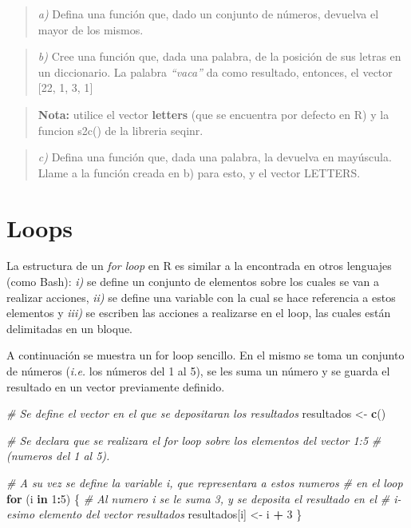 \documentclass[]{article}
\newenvironment{Shaded}{\begin{snugshade}}{\end{snugshade}}
\newcommand{\CommentTok}[1]{\textcolor[rgb]{0.56,0.35,0.01}{\textit{#1}}}
\newcommand{\ControlFlowTok}[1]{\textcolor[rgb]{0.13,0.29,0.53}{\textbf{#1}}}
\newcommand{\DecValTok}[1]{\textcolor[rgb]{0.00,0.00,0.81}{#1}}
\newcommand{\KeywordTok}[1]{\textcolor[rgb]{0.13,0.29,0.53}{\textbf{#1}}}
\newcommand{\NormalTok}[1]{#1}
\newcommand{\OperatorTok}[1]{\textcolor[rgb]{0.81,0.36,0.00}{\textbf{#1}}}
\newcommand{\StringTok}[1]{\textcolor[rgb]{0.31,0.60,0.02}{#1}}
\begin{document}
\begin{quote}
\emph{a)} Defina una función que, dado un conjunto de números, devuelva
el mayor de los mismos.
\end{quote}

\begin{quote}
\emph{b)} Cree una función que, dada una palabra, de la posición de sus
letras en un diccionario. La palabra \emph{``vaca''} da como resultado,
entonces, el vector {[}22, 1, 3, 1{]}
\end{quote}

\begin{quote}
\textbf{Nota:} utilice el vector \textbf{letters} (que se encuentra por
defecto en R) y la funcion s2c() de la libreria seqinr.
\end{quote}

\begin{quote}
\emph{c)} Defina una función que, dada una palabra, la devuelva en
mayúscula. Llame a la función creada en b) para esto, y el vector
LETTERS.
\end{quote}

\hypertarget{loops}{%
\section{Loops}\label{loops}}

La estructura de un \emph{for loop} en R es similar a la encontrada en
otros lenguajes (como Bash): \emph{i)} se define un conjunto de
elementos sobre los cuales se van a realizar acciones, \emph{ii)} se
define una variable con la cual se hace referencia a estos elementos y
\emph{iii)} se escriben las acciones a realizarse en el loop, las cuales
están delimitadas en un bloque.

A continuación se muestra un for loop sencillo. En el mismo se toma un
conjunto de números (\emph{i.e.} los números del 1 al 5), se les suma un
número y se guarda el resultado en un vector previamente definido.

\begin{Shaded}
\begin{Highlighting}[]
\CommentTok{# Se define el vector en el que se depositaran los resultados}
\NormalTok{resultados <-}\StringTok{ }\KeywordTok{c}\NormalTok{()}

\CommentTok{# Se declara que se realizara el for loop sobre los elementos del vector 1:5 }
\CommentTok{#(numeros del 1 al 5).}

\CommentTok{# A su vez se define la variable i, que representara a estos numeros }
\CommentTok{# en el loop}
\ControlFlowTok{for}\NormalTok{ (i }\ControlFlowTok{in} \DecValTok{1}\OperatorTok{:}\DecValTok{5}\NormalTok{) \{}
    \CommentTok{# Al numero i se le suma 3, y se deposita el resultado en el }
    \CommentTok{# i-esimo elemento del vector resultados}
\NormalTok{    resultados[i] <-}\StringTok{ }\NormalTok{i }\OperatorTok{+}\StringTok{ }\DecValTok{3}
\NormalTok{\}}
\end{Highlighting}
\end{Shaded}
\end{document}
